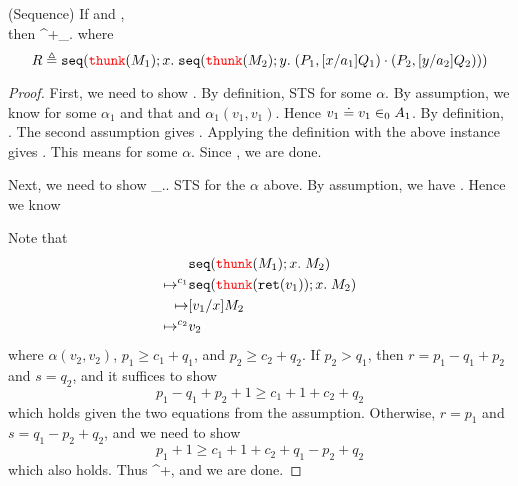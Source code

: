 \begin{lemma}(Sequence)
  If  and 
  ,\\ then 
  {^+}{\_.}
  where 
  \[ 
  R \triangleq 
\seq{\thunk{M_1}}{x}{\seq{\thunk{M_2}}{y}{
    (P_1,[x/a_1]Q_1) \cdot (P_2,[y/a_2]Q_2)
  }}
  \]
\end{lemma}

\begin{proof}
  First, we need to show .
  By definition, STS  for some $\alpha$. 
  By assumption, we know  for some $\alpha_1$ and 
  that  and $\alpha_1(v_1,v_1)$. Hence $\eqVal{v_1}{v_1}{A_1}$.
  By definition, .
  The second assumption gives . 
  Applying the definition with the above instance gives 
  . This means 
  for some $\alpha$. Since
  , we are done.

  Next, we need to show 
  {}{\_.}.
  STS 
  {}{} for the $\alpha$
  above. By assumption, we have 
  .
  Hence we know 
  \begin{mathpar}



    

  \end{mathpar}
  Note that 
  \begin{align*}
    &\seq{\thunk{M_1}}{x}{M_2}\\
    \mapsto^{c_1}& \seq{\thunk{\ret{v_1}}}{x}{M_2}\\
    \mapsto &[v_1/x]M_2\\
    \mapsto^{c_2}& v_2
  \end{align*}
  where 
  $\alpha(v_2,v_2)$, 
  $p_1 \ge c_1 + q_1$, and $p_2 \ge c_2 + q_2$. 
  If $p_2 > q_1$, then $r = p_1 - q_1 + p_2$ and $s = q_2$, and it suffices 
  to show 
  \[
    p_1 - q_1 + p_2 + 1\ge c_1 + 1 + c_2 + q_2 
  \]
  which holds given the two equations from the assumption.
  Otherwise, $r = p_1$ and $s = q_1 - p_2 + q_2$, and we need to show
  \[
  p_1 + 1\ge c_1 + 1 + c_2 + q_1 - p_2 + q_2
  \]
  which also holds. Thus 
  {^+}{}, and we are done.
\end{proof}

